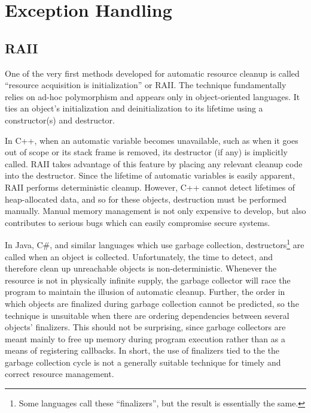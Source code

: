 \documentclass[11pt]{article}
\newcommand{\maybePage}{\newpage}
\begin{document}
\maybePage
\section{Exception Handling}

\subsection{RAII}
\label{RAII}

One of the very first methods developed for automatic resource cleanup is called ``resource acquisition is initialization'' or RAII.
The technique fundamentally relies on ad-hoc polymorphism and appears only in object-oriented languages.
It ties an object's initialization and deinitialization to its lifetime using a constructor(s) and destructor.

In C++, when an automatic variable becomes unavailable, such as when it goes out of scope or its stack frame is removed, its destructor (if any) is implicitly called.
RAII takes advantage of this feature by placing any relevant cleanup code into the destructor.\cite{cplusplusLanguage}
Since the lifetime of automatic variables is easily apparent, RAII performs deterministic cleanup.
However, C++ cannot detect lifetimes of heap-allocated data, and so for these objects, destruction must be performed manually.
Manual memory management is not only expensive to develop, but also contributes to serious bugs which can easily compromise secure systems.\cite{WeimerNecula08}


In Java, C\#, and similar languages which use garbage collection, destructors\footnote{Some languages call these ``finalizers'', but the result is essentially the same.} are called when an object is collected.
Unfortunately, the time to detect, and therefore clean up unreachable objects is non-deterministic.\cite{JavaStandard}\cite{cSharpStandard}
Whenever the resource is not in physically infinite supply, the garbage collector will race the program to maintain the illusion of automatic cleanup.\cite{WeimerNecula08}
Further, the order in which objects are finalized during garbage collection cannot be predicted, so the technique is unsuitable when there are ordering dependencies between several objects' finalizers.\cite{WeimerNecula08}
This should not be surprising, since garbage collectors are meant mainly to free up memory during program execution rather than as a means of registering callbacks.
In short, the use of finalizers tied to the the garbage collection cycle is not a generally suitable technique for timely and correct resource management.
\end{document}
